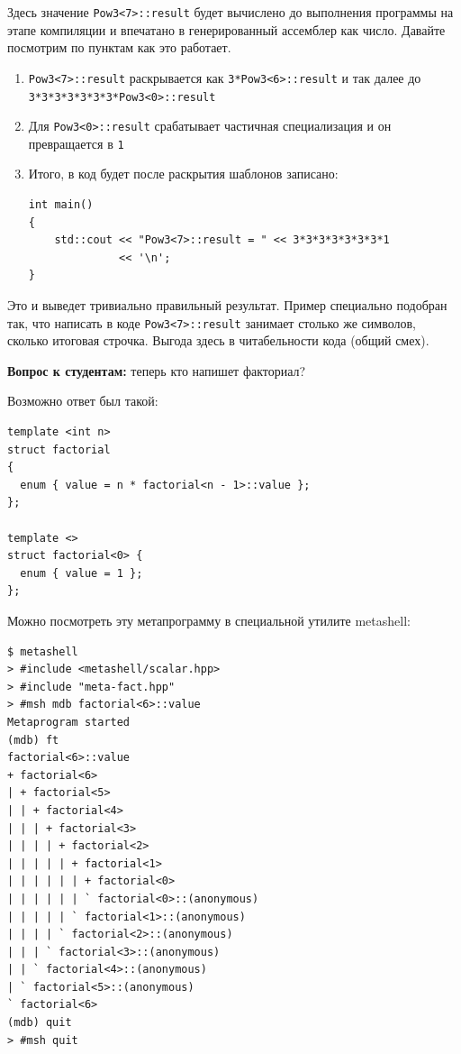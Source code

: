 \documentclass[a4paper,12pt,oneside]{article}
\newif\ifanswers
\begin{document}
Здесь значение \lstinline!Pow3<7>::result! будет вычислено до выполнения программы на этапе компиляции и впечатано в генерированный ассемблер как число. Давайте посмотрим по пунктам как это работает.

\begin{enumerate}
\item
\lstinline!Pow3<7>::result! раскрывается как \lstinline!3*Pow3<6>::result! и так далее до \lstinline!3*3*3*3*3*3*3*Pow3<0>::result!
\item
Для \lstinline!Pow3<0>::result! срабатывает частичная специализация и он превращается в \lstinline!1!
\item
Итого, в код будет после раскрытия шаблонов записано:
\begin{lstlisting}
int main() 
{ 
    std::cout << "Pow3<7>::result = " << 3*3*3*3*3*3*3*1                                         
              << '\n'; 
} 
\end{lstlisting}
\end{enumerate}

Это и выведет тривиально правильный результат. Пример специально подобран так, что написать в коде \lstinline!Pow3<7>::result! занимает столько же символов, сколько итоговая строчка. Выгода здесь в читабельности кода (общий смех). 

\textbf{Вопрос к студентам:} теперь кто напишет факториал?

\ifanswers
Ответ: скорее всего будет по аналогии со степенью, хотя могут быть взбрыки у неглупых групп.
\fi

Возможно ответ был такой:

\begin{lstlisting}
template <int n>
struct factorial 
{
  enum { value = n * factorial<n - 1>::value };
};
 
template <>
struct factorial<0> {
  enum { value = 1 };
};
\end{lstlisting}

Можно посмотреть эту метапрограмму в специальной утилите metashell:

\begin{verbatim}
$ metashell
> #include <metashell/scalar.hpp>
> #include "meta-fact.hpp"
> #msh mdb factorial<6>::value
Metaprogram started
(mdb) ft
factorial<6>::value
+ factorial<6> 
| + factorial<5> 
| | + factorial<4> 
| | | + factorial<3> 
| | | | + factorial<2> 
| | | | | + factorial<1> 
| | | | | | + factorial<0> 
| | | | | | ` factorial<0>::(anonymous) 
| | | | | ` factorial<1>::(anonymous) 
| | | | ` factorial<2>::(anonymous) 
| | | ` factorial<3>::(anonymous) 
| | ` factorial<4>::(anonymous) 
| ` factorial<5>::(anonymous) 
` factorial<6> 
(mdb) quit
> #msh quit
\end{verbatim}
\end{document}
